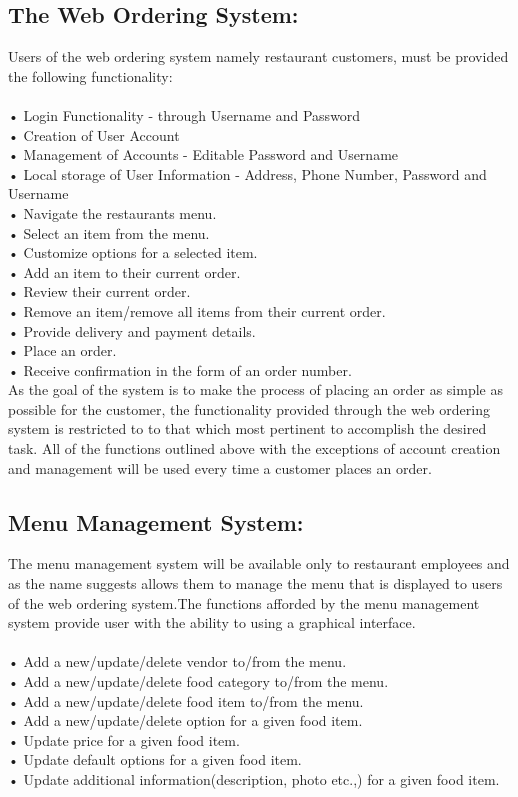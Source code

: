 \documentclass{scrreprt}
\begin{document}
\subsection{The Web Ordering System:}
Users of the web ordering system namely restaurant customers, must be provided the following functionality: \\ \\
• Login Functionality - through Username and Password \\
• Creation of User Account \\
• Management of Accounts - Editable Password and Username \\
• Local storage of User Information - Address, Phone Number, Password and Username \\
• Navigate the restaurants menu.\\
• Select an item from the menu.\\
• Customize options for a selected item.\\
• Add an item to their current order.\\
• Review their current order.\\
• Remove an item/remove all items from their current order.\\
• Provide delivery and payment details.\\
• Place an order.\\
• Receive confirmation in the form of an order number.\\
\newline
As the goal of the system is to make the process of placing an order as simple as possible for the customer, the functionality provided through the web ordering system is restricted to to that which most pertinent to accomplish the desired task. All of the functions outlined above with the exceptions of account creation and management will be used every time a customer places an order. \\
\newline
\subsection{Menu Management System:} 
The menu management system will be available only to restaurant employees and as the name suggests allows them to manage the menu that is displayed to users of the web ordering system.The functions afforded by the menu management system provide user with the ability to using a graphical interface. \\ \\
• Add a new/update/delete vendor to/from the menu. \\
• Add a new/update/delete food category to/from the menu.\\
• Add a new/update/delete food item to/from the menu.\\
• Add a new/update/delete option for a given food item.\\
• Update price for a given food item.\\
• Update default options for a given food item.\\
• Update additional information(description, photo etc.,) for a given food item.\\
\end{document}
